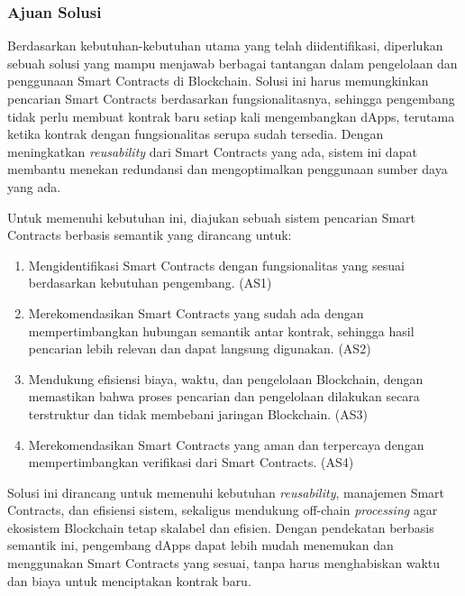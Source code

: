 \subsubsection{Ajuan Solusi}
\label{subsubsec:ajuan-solusi}

Berdasarkan kebutuhan-kebutuhan utama yang telah diidentifikasi, diperlukan sebuah solusi yang mampu menjawab berbagai tantangan dalam pengelolaan dan penggunaan Smart Contracts di Blockchain. Solusi ini harus memungkinkan pencarian Smart Contracts berdasarkan fungsionalitasnya, sehingga pengembang tidak perlu membuat kontrak baru setiap kali mengembangkan dApps, terutama ketika kontrak dengan fungsionalitas serupa sudah tersedia. Dengan meningkatkan \textit{reusability} dari Smart Contracts yang ada, sistem ini dapat membantu menekan redundansi dan mengoptimalkan penggunaan sumber daya yang ada.

Untuk memenuhi kebutuhan ini, diajukan sebuah sistem pencarian Smart Contracts berbasis semantik yang dirancang untuk:

% 

\begin{enumerate}
	\item Mengidentifikasi Smart Contracts dengan fungsionalitas yang sesuai berdasarkan kebutuhan pengembang. (AS1)
	\item Merekomendasikan Smart Contracts yang sudah ada dengan mempertimbangkan hubungan semantik antar kontrak, sehingga hasil pencarian lebih relevan dan dapat langsung digunakan. (AS2)
	\item Mendukung efisiensi biaya, waktu, dan pengelolaan Blockchain, dengan memastikan bahwa proses pencarian dan pengelolaan dilakukan secara terstruktur dan tidak membebani jaringan Blockchain. (AS3)
	\item Merekomendasikan Smart Contracts yang aman dan terpercaya dengan mempertimbangkan verifikasi dari Smart Contracts. (AS4)
\end{enumerate}

Solusi ini dirancang untuk memenuhi kebutuhan \textit{reusability}, manajemen Smart Contracts, dan efisiensi sistem, sekaligus mendukung off-chain \textit{processing} agar ekosistem Blockchain tetap skalabel dan efisien. Dengan pendekatan berbasis semantik ini, pengembang dApps dapat lebih mudah menemukan dan menggunakan Smart Contracts yang sesuai, tanpa harus menghabiskan waktu dan biaya untuk menciptakan kontrak baru.